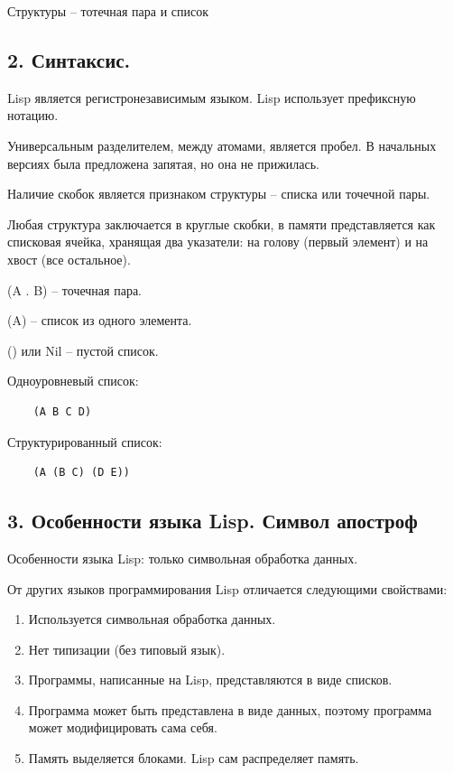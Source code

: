
Структуры -- тотечная пара и список


\subsection*{2. Синтаксис.}

Lisp является регистронезависимым языком. Lisp использует префиксную нотацию.

Универсальным разделителем, между атомами, является пробел. В начальных версиях была предложена запятая, но она не прижилась.

Наличие скобок является признаком структуры -- списка или точечной пары.


Любая структура заключается в круглые скобки, в памяти представляется как списковая ячейка, хранящая два указатели: на голову (первый элемент) и на хвост (все остальное).

(A . B) -- точечная пара.

(A) -- список из одного элемента.

() или Nil -- пустой список.

Одноуровневый список:
\begin{lstlisting}
	(A B C D)
\end{lstlisting}

Структурированный список:
\begin{lstlisting}
	(A (B C) (D E))
\end{lstlisting}

\subsection*{3. Особенности языка Lisp. Символ апостроф}
Особенности языка Lisp: только символьная обработка данных.

От других языков программирования Lisp отличается следующими свойствами:

\begin{enumerate}
\item Используется символьная обработка данных.

\item Нет типизации (без типовый язык).

\item Программы, написанные на Lisp, представляются в виде списков.

\item Программа может быть представлена в виде данных, поэтому программа может модифицировать сама себя.

\item Память выделяется блоками. Lisp сам распределяет память.
\end{enumerate}




